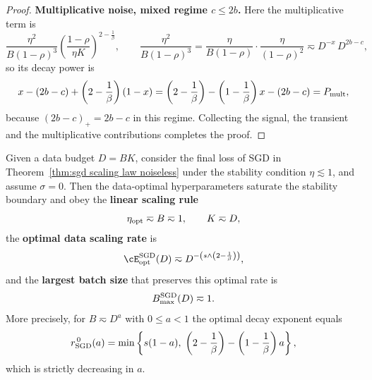 \begin{proof}
\textbf{Multiplicative noise, mixed regime \(c\leq2b\).} Here the multiplicative term is
\[
    \frac{\eta^{2}}{B(1-\rho)^{3}}\left(\frac{1-\rho}{\eta K}\right)^{2-\frac1\beta},
    \qquad
    \frac{\eta^{2}}{B(1-\rho)^{3}}
    =
    \frac{\eta}{B(1-\rho)}\cdot\frac{\eta}{(1-\rho)^{2}}
    \eqsim
    D^{-x}\,D^{2b-c},
\]
so its decay power is
\[
    x-(2b-c)+\left(2-\frac1\beta\right)(1-x)
    =
    \left(2-\frac1\beta\right)-\left(1-\frac1\beta\right)x-(2b-c)
    =
    P_{\rm mult},
\]
because \(\left(2b-c\right)_{+}=2b-c\) in this regime. Collecting the signal, the transient and the multiplicative contributions completes the proof.
\end{proof}

\begin{theorem}
\label{thm:sgd data scaling noiseless}
Given a data budget \(D=BK\), consider the final loss of SGD in Theorem~\ref{thm:sgd scaling law noiseless} under the stability condition \(\eta\lesssim1\), and assume \(\sigma=0\). Then the data-optimal hyperparameters saturate the stability boundary and obey the \textbf{linear scaling rule}
\[
    \eta_{\rm opt}\eqsim B\eqsim1,
    \qquad
    K\eqsim D,
\]
the \textbf{optimal data scaling rate} is
\[
    \cE_{\rm opt}^{\rm SGD}(D)
    \eqsim
    D^{-\left(s\wedge\left(2-\frac1\beta\right)\right)},
\]
and the \textbf{largest batch size} that preserves this optimal rate is
\[
    B_{\max}^{\rm SGD}(D)\eqsim1.
\]
More precisely, for \(B\eqsim D^{a}\) with \(0\leq a<1\) the optimal decay exponent equals
\[
    r_{\rm SGD}^{\,0}(a)
    =
    \min\left\{
        s(1-a),\;
        \left(2-\frac1\beta\right)-\left(1-\frac1\beta\right)a
    \right\},
\]
which is strictly decreasing in \(a\).
\end{theorem}

